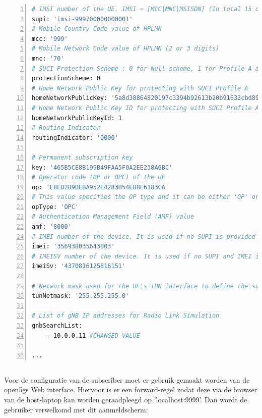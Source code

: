\begin{lstlisting}[basicstyle=\small, frame=single, breaklines=true, postbreak=\mbox{\textcolor{red}{$\hookrightarrow$}\space}, escapeinside ={\%,}, escapechar={!}, numbers=left, language=sh, caption=UE configuratie]
# IMSI number of the UE. IMSI = [MCC|MNC|MSISDN] (In total 15 digits)
supi: 'imsi-999700000000001'
# Mobile Country Code value of HPLMN
mcc: '999'
# Mobile Network Code value of HPLMN (2 or 3 digits)
mnc: '70'
# SUCI Protection Scheme : 0 for Null-scheme, 1 for Profile A and 2 for Profile B
protectionScheme: 0
# Home Network Public Key for protecting with SUCI Profile A
homeNetworkPublicKey: '5a8d38864820197c3394b92613b20b91633cbd897119273bf8e4a6f4eec0a650'
# Home Network Public Key ID for protecting with SUCI Profile A
homeNetworkPublicKeyId: 1
# Routing Indicator
routingIndicator: '0000'

# Permanent subscription key
key: '465B5CE8B199B49FAA5F0A2EE238A6BC'
# Operator code (OP or OPC) of the UE
op: 'E8ED289DEBA952E4283B54E88E6183CA'
# This value specifies the OP type and it can be either 'OP' or 'OPC'
opType: 'OPC'
# Authentication Management Field (AMF) value
amf: '8000'
# IMEI number of the device. It is used if no SUPI is provided
imei: '356938035643803'
# IMEISV number of the device. It is used if no SUPI and IMEI is provided
imeiSv: '4370816125816151'

# Network mask used for the UE's TUN interface to define the subnet size
tunNetmask: '255.255.255.0'

# List of gNB IP addresses for Radio Link Simulation
gnbSearchList:
    - 10.0.0.11 #CHANGED VALUE

...
\end{lstlisting}

\subsection{}%
\label{sec:subscriber_config}%

Voor de configuratie van de subscriber moet er gebruik gemaakt worden van de \gls{open5gs} Web interface. Hiervoor is er een forward-regel zodat deze via de browser van de host-laptop kan worden geraadpleegd op 'localhost:9999'. Dan wordt de gebruiker verwelkomd met dit aanmeldscherm:

